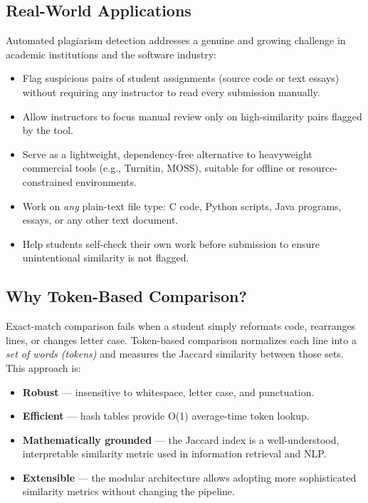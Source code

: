 \documentclass[12pt,a4paper]{article}
\begin{document}
\subsection{Real-World Applications}

Automated plagiarism detection addresses a genuine and growing challenge in academic institutions and the software industry:

\begin{itemize}[leftmargin=1.5cm, itemsep=4pt]
  \item Flag suspicious pairs of student assignments (source code or text essays) without requiring any instructor to read every submission manually.
  \item Allow instructors to focus manual review only on high-similarity pairs flagged by the tool.
  \item Serve as a lightweight, dependency-free alternative to heavyweight commercial tools (e.g., Turnitin, MOSS), suitable for offline or resource-constrained environments.
  \item Work on \emph{any} plain-text file type: C code, Python scripts, Java programs, essays, or any other text document.
  \item Help students self-check their own work before submission to ensure unintentional similarity is not flagged.
\end{itemize}

\subsection{Why Token-Based Comparison?}

Exact-match comparison fails when a student simply reformats code, rearranges lines, or changes letter case. Token-based comparison normalizes each line into a \emph{set of words (tokens)} and measures the Jaccard similarity between those sets. This approach is:

\begin{itemize}[leftmargin=1.5cm, itemsep=4pt]
  \item \textbf{Robust} — insensitive to whitespace, letter case, and punctuation.
  \item \textbf{Efficient} — hash tables provide O(1) average-time token lookup.
  \item \textbf{Mathematically grounded} — the Jaccard index is a well-understood, interpretable similarity metric used in information retrieval and NLP.
  \item \textbf{Extensible} — the modular architecture allows adopting more sophisticated similarity metrics without changing the pipeline.
\end{itemize}
\end{document}
